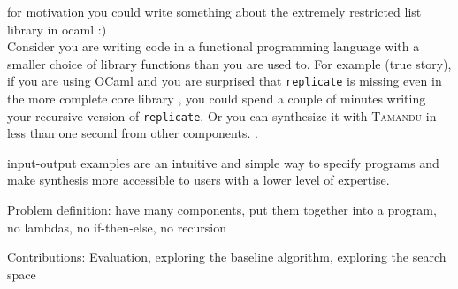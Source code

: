 for motivation you could write something about the extremely restricted list library in ocaml :)\\
Consider you are writing code in a functional programming language with a smaller choice of library functions than you are used to. For example (true story), if you are using OCaml and you are surprised that \lstinline?replicate? is missing even in the more complete core library , you could spend a couple of minutes writing your recursive version of \lstinline?replicate?. Or you can synthesize it with \textsc{Tamandu} in less than one second from other components. .

input-output examples are an intuitive and simple way to specify programs and make synthesis more accessible to users with a lower level of expertise.


Problem definition: have many components, put them together into a program, no lambdas, no if-then-else, no recursion
  

  
  
Contributions: Evaluation, exploring the baseline algorithm, exploring the search space

